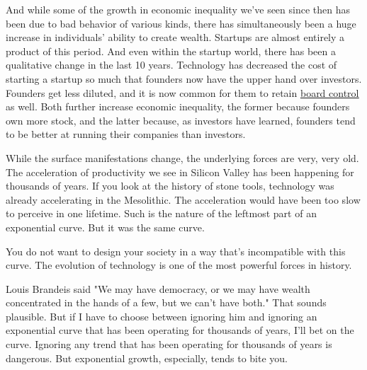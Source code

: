 And while some of the growth in economic
                  inequality we've seen since then has been due to bad behavior
                  of various kinds, there has simultaneously been a huge
                  increase in individuals' ability to create wealth. Startups
                  are almost entirely a product of this period. And even within
                  the startup world, there has been a qualitative change in the
                  last 10 years. Technology has decreased the cost of starting a
                  startup so much that founders now have the upper hand over
                  investors. Founders get less diluted, and it is now common for
                  them to retain
                  \href{http://www.paulgraham.com/control.html}{\underline{board control}} as well. Both
                  further increase economic inequality, the former because
                  founders own more stock, and the latter because, as investors
                  have learned, founders tend to be better at running their
                  companies than investors.

While the surface
                  manifestations change, the underlying forces are very, very
                  old. The acceleration of productivity we see in Silicon Valley
                  has been happening for thousands of years. If you look at the
                  history of stone tools, technology was already accelerating in
                  the Mesolithic. The acceleration would have been too slow to
                  perceive in one lifetime. Such is the nature of the leftmost
                  part of an exponential curve. But it was the same curve.

You
                  do not want to design your society in a way that's
                  incompatible with this curve. The evolution of technology is
                  one of the most powerful forces in history.

Louis
                  Brandeis said "We may have democracy, or we may have wealth
                  concentrated in the hands of a few, but we can't have both."
                  That sounds plausible. But if I have to choose between
                  ignoring him and ignoring an exponential curve that has been
                  operating for thousands of years, I'll bet on the curve.
                  Ignoring any trend that has been operating for thousands of
                  years is dangerous. But exponential growth, especially, tends
                  to bite you.


